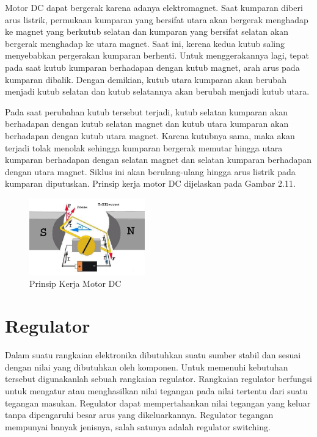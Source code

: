 Motor DC dapat bergerak karena adanya elektromagnet. Saat kumparan diberi arus listrik, permukaan kumparan yang bersifat utara akan bergerak menghadap ke magnet yang berkutub selatan dan kumparan yang bersifat selatan akan bergerak menghadap ke utara magnet. Saat ini, kerena kedua kutub saling menyebabkan pergerakan kumparan berhenti. Untuk menggerakannya lagi, tepat pada saat kutub kumparan berhadapan dengan kutub magnet, arah arus pada kumparan dibalik. Dengan demikian, kutub utara kumparan akan berubah menjadi kutub selatan dan kutub selatannya akan berubah menjadi kutub utara.  

Pada saat perubahan kutub tersebut terjadi, kutub selatan kumparan akan berhadapan dengan kutub selatan magnet dan kutub utara kumparan akan berhadapan dengan kutub utara magnet. Karena kutubnya sama, maka akan terjadi tolak menolak sehingga kumparan bergerak memutar hingga utara kumparan berhadapan dengan selatan magnet dan selatan kumparan berhadapan dengan utara magnet. Siklus ini akan berulang-ulang hingga arus listrik pada kumparan diputuskan. Prinsip kerja motor DC dijelaskan pada Gambar 2.11.  
	\begin{figure}[H]
	\centering
	\includegraphics[width=5cm]{gambar/prinsipDC.jpg}
	\caption{Prinsip Kerja Motor DC}
\end{figure}


\section{Regulator}
Dalam suatu rangkaian elektronika dibutuhkan suatu sumber stabil dan sesuai dengan nilai yang dibutuhkan oleh komponen. Untuk memenuhi kebutuhan tersebut digunakanlah sebuah rangkaian regulator. Rangkaian regulator berfungsi untuk mengatur atau menghasilkan nilai tegangan pada nilai tertentu dari suatu tegangan masukan. Regulator dapat mempertahankan nilai tegangan yang keluar tanpa dipengaruhi besar arus yang dikeluarkannya. Regulator tegangan mempunyai banyak jenisnya, salah satunya adalah regulator switching.

